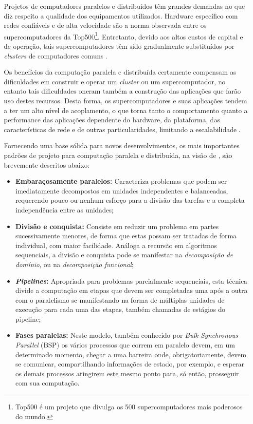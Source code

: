 \documentclass[english,brazilian]{UNISINOSmonografia} %
\begin{document}
Projetos de computadores paralelos e distribuídos têm grandes demandas no que diz respeito a qualidade dos equipamentos utilizados. 
Hardware específico com redes confiáveis e de alta velocidade são a norma observada entre os supercomputadores da Top500\footnote{
	Top500 é um projeto que divulga os 500 supercomputadores mais poderosos do mundo.
}.
Entretanto, devido aos altos custos de capital e de operação, tais supercomputadores têm sido gradualmente substituídos por \textit{clusters} de computadores comuns \cite{Baker1999}.


Os benefícios da computação paralela e distribuída certamente compensam as dificuldades em construir e operar um \textit{cluster} ou um supercomputador, no entanto tais dificuldades oneram também a construção das aplicações que farão uso destes recursos. 
Desta forma, os supercomputadores e suas aplicações tendem a ter um alto nível de acoplamento, o que torna tanto o comportamento quanto a performance das aplicações dependente do hardware, da plataforma, das características de rede e de outras particularidades, limitando a escalabilidade \cite{Rajan2011}.

Fornecendo uma base sólida para novos desenvolvimentos, os mais importantes padrões de projeto para computação paralela e distribuída, na visão de , são brevemente descritos abaixo:

\begin{itemize}
	\item \textbf{Embaraçosamente paralelos:}
	Caracteriza problemas que podem ser imediatamente decompostos em unidades independentes e balanceadas, requerendo pouco ou nenhum esforço para a divisão das tarefas e a completa independência entre as unidades;
	
	\item \textbf{Divisão e conquista:} 
	Consiste em reduzir um problema em partes sucessivamente menores, de forma que estas possam ser tratadas de forma individual, com maior facilidade. 
	Análoga a recursão em algoritmos sequenciais, a divisão e conquista pode se manifestar na \textit{decomposição de domínio}, ou na \textit{decomposição funcional};
	
	\item \textbf{\textit{Pipelines}:}
	Apropriada para problemas parcialmente sequenciais, esta técnica divide a computação em etapas que devem ser completadas uma após a outra com o paralelismo se manifestando na forma de múltiplas unidades de execução para cada uma das etapas, também chamadas de estágios do pipeline;
	
	\item \textbf{Fases paralelas:}
	Neste modelo, também conhecido por \textit{Bulk Synchronous Parallel} (BSP) os vários processos que correm em paralelo devem, em um determinado momento, chegar a uma barreira onde, obrigatoriamente, devem se comunicar, compartilhando informações de estado, por exemplo, e esperar os demais processos atingirem este mesmo ponto para, só então, prosseguir com sua computação.
\end{itemize}
\end{document}
